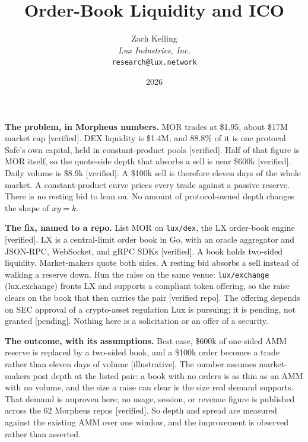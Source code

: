 \documentclass[11pt,a4paper]{article}
\title{Order-Book Liquidity and ICO}
\author{Zach Kelling\\\textit{Lux Industries, Inc.}\\\texttt{research@lux.network}}
\date{2026}
\newcommand{\code}[1]{\texttt{\small #1}}
\begin{document}
\luxcoverpage
\sloppy

\par
\vspace{0.7ex}
\par
\vspace{0.7ex}
\noindent{\color{rule}\rule{\linewidth}{1.1pt}}\par
\vspace{1.2ex}

\noindent\textbf{The problem, in Morpheus numbers.}
MOR trades at \$1.95, about \$17M market cap [verified]. DEX liquidity is \$1.4M, and 88.8\% of it
is one protocol Safe's own capital, held in constant-product pools [verified]. Half of that figure
is MOR itself, so the quote-side depth that absorbs a sell is near \$600k [verified]. Daily volume
is \$8.9k [verified]. A \$100k sell is therefore eleven days of the whole market. A constant-product
curve prices every trade against a passive reserve. There is no resting bid to lean on. No amount of
protocol-owned depth changes the shape of $xy=k$.

\noindent\textbf{The fix, named to a repo.}
List MOR on \code{lux/dex}, the LX order-book engine [verified]. LX is a central-limit order book in
Go, with an oracle aggregator and JSON-RPC, WebSocket, and gRPC SDKs [verified]. A book holds
two-sided liquidity. Market-makers quote both sides. A resting bid absorbs a sell instead of walking
a reserve down. Run the raise on the same venue: \code{lux/exchange} (lux.exchange) fronts LX and
supports a compliant token offering, so the raise clears on the book that then carries the pair
[verified repo]. The offering depends on SEC approval of a crypto-asset regulation Lux is pursuing;
it is pending, not granted [pending]. Nothing here is a solicitation or an offer of a security.

\noindent\textbf{The outcome, with its assumptions.}
Best case, \$600k of one-sided AMM reserve is replaced by a two-sided book, and a \$100k order
becomes a trade rather than eleven days of volume [illustrative]. The number assumes market-makers
post depth at the listed pair: a book with no orders is as thin as an AMM with no volume, and the
size a raise can clear is the size real demand supports. That demand is unproven here; no usage,
session, or revenue figure is published across the 62 Morpheus repos [verified]. So depth and spread
are measured against the existing AMM over one window, and the improvement is observed rather than
asserted.
\end{document}
